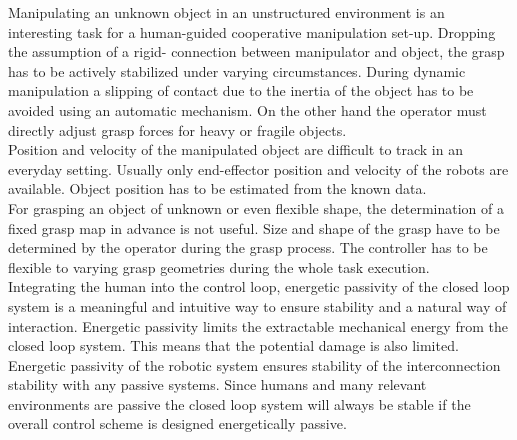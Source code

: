 \documentclass[a4paper,twoside, openright,12pt]{report}
\begin{document}
Manipulating an unknown object in an unstructured environment is an interesting task for a human-guided cooperative manipulation set-up. Dropping the assumption of a rigid- connection between manipulator and object, the grasp has to be actively stabilized under varying circumstances. During dynamic manipulation a slipping of contact due to the inertia of the object has to be avoided using an automatic mechanism. On the other hand the operator must directly adjust grasp forces for heavy or fragile objects.\\
Position and velocity of the manipulated object are difficult to track in an everyday setting. Usually only end-effector position and velocity of the robots are available. Object position has to be estimated from the known data.\\
For grasping an  object of unknown or even flexible shape, the determination of a fixed grasp map in advance is not useful. Size and shape of the grasp have to be determined by the operator during the grasp process. The controller has to be flexible to varying grasp geometries during the whole task execution.\\
Integrating the human into the control loop, energetic passivity of the closed loop system is a meaningful and intuitive way to ensure stability and a natural way of interaction. Energetic passivity limits the extractable mechanical energy from the closed loop system. This means that the potential damage is also limited. 
Energetic passivity of the robotic system ensures stability of the interconnection stability with any passive systems. Since humans and many relevant environments are passive the closed loop system will always be stable if the overall control scheme is designed energetically passive.
\end{document}
